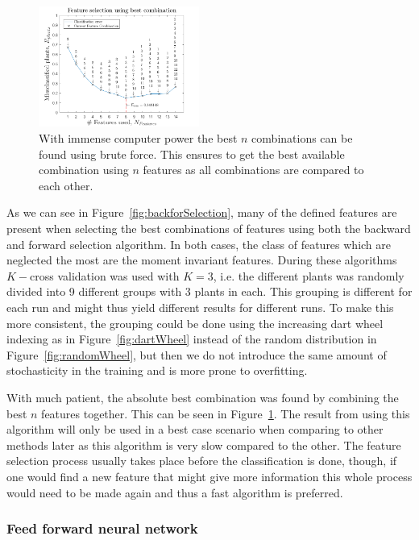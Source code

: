 \begin{figure}[H]
\centering
\includegraphics[width=0.47\textwidth]{./figure/result/Quadratic/combination.png}
\caption{\label{fig:combSelection} With immense computer power the best $n$ combinations can be found using brute force. This ensures to get the best available combination using $n$ features as all combinations are compared to each other.  }
\end{figure}

As we can see in Figure~\ref{fig:backforSelection}, many of the defined features are present when selecting the best combinations of features using both the backward and forward selection algorithm. In both cases, the class of features which are neglected the most are the moment invariant features. During these algorithms $K-$cross validation was used with $K=3$, i.e. the different plants was randomly divided into 9 different groups with 3 plants in each. This grouping is different for each run and might thus yield different results for different runs. To make this more consistent, the grouping could be done using the increasing dart wheel indexing as in Figure~\ref{fig:dartWheel} instead of the random distribution in Figure~\ref{fig:randomWheel}, but then we do not introduce the same amount of stochasticity in the training and is more prone to overfitting.

With much patient, the absolute best combination was found by combining the best $n$ features together. This can be seen in Figure~\ref{fig:combSelection}. The result from using this algorithm will only be used in a best case scenario when comparing to other methods later as this algorithm is very slow compared to the other. The feature selection process usually takes place before the classification is done, though, if one would find a new feature that might give more information this whole process would need to be made again and thus a fast algorithm is preferred.

\subsubsection{Feed forward neural network}

